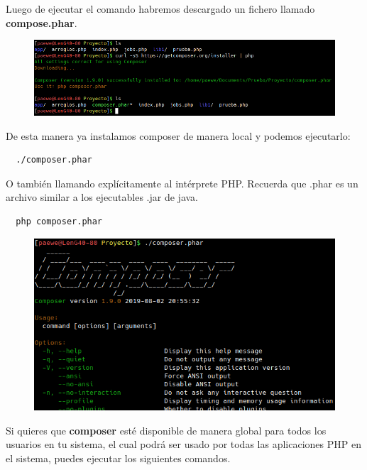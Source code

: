 \documentclass{article}
\begin{document}
Luego de ejecutar el comando habremos descargado un fichero llamado
\textbf{compose.phar}.

\begin{figure}[h!]
  \centering
  \includegraphics[scale=0.75]{./Pictures/056_composerphar.png}
\end{figure}

De esta manera ya instalamos composer de manera local y podemos ejecutarlo:\\

\begin{verbatim}
  ./composer.phar
\end{verbatim}

O también llamando explícitamente al intérprete PHP. Recuerda que .phar es un
archivo similar a los ejecutables .jar de java.\\

\begin{verbatim}
  php composer.phar
\end{verbatim}


\begin{figure}[h!]
  \centering
  \includegraphics[scale=0.75]{./Pictures/057_composerphar.png}
\end{figure}

Si quieres que \textbf{composer} esté disponible de manera global para todos
los usuarios en tu sistema, el cual podrá ser usado por todas las aplicaciones
PHP en el sistema, puedes ejecutar los siguientes comandos.\\
\end{document}
